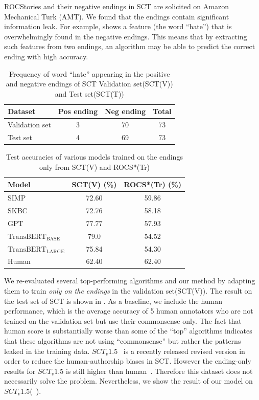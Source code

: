 ROCStories and their negative endings in SCT are solicited
on Amazon Mechanical Turk (AMT). We found that the endings
contain significant information leak. For example, 
shows a feature (the word ``hate'') that is overwhelmingly found 
in the negative endings.
This means that by extracting such features from two endings, an algorithm
may be able to predict the correct ending with high accuracy. 



\begin{table}[th!]
\small
\centering
\begin{tabular}{lccc}
\hline
\textbf{Dataset}& Pos ending& Neg ending &Total\\
\hline
Validation set & 3  & 70 &73\\
Test set          & 4  & 69 &73\\
\hline
\end{tabular}
\caption{Frequency of word ``hate'' appearing in the positive and 
negative endings of SCT Validation set(SCT(V)) and Test set(SCT(T))}
\label{tab:hate}
\end{table}

\begin{table}[th!]
\small
\centering
\begin{tabular}{lcc}
\hline
\textbf{Model}& SCT(V) (\%) &ROCS*(Tr) (\%)\\
\hline
SIMP& 72.60 &59.86\\
SKBC&72.76&58.18\\
GPT& 77.77 &57.93\\
$\text{TransBERT}_\text{BASE}$&79.0&54.52\\
$\text{TransBERT}_\text{LARGE}$&75.84&54.30\\
\hline
Human& 62.40&62.40\\
\hline
\end{tabular}
\caption{Test accuracies of various models trained on the endings only
from SCT(V) and ROCS*(Tr)}
\label{tab:end}
\end{table}


We re-evaluated several top-performing algorithms and our method
by adapting them to train {\em only on the endings} in the validation set(SCT(V)). 
The result on the test set of SCT is shown in . 
As a baseline, we include the human performance, which is the average
accuracy of 5 human annotators who are not
trained on the validation set but use their commonsense only. The fact
that human score is substantially worse than some of the ``top'' algorithms
indicates that these algorithms are not using ``commonsense'' but rather
the patterns leaked in the training data. $SCT_v1.5$~\cite{sharma2018tackling}
is a recently released revised version in order to reduce the 
human-authorship biases in SCT. However the ending-only results for
$SCT_v1.5$ is still higher than human~\cite{sharma2018tackling}. 
Therefore this dataset does not necessarily solve the problem. 
Nevertheless, we show the result of our model on $SCT_v1.5$(~).

